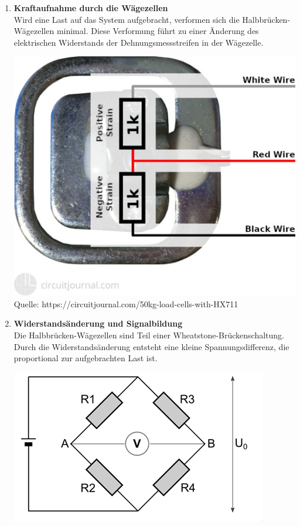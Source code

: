 \documentclass[ngerman,12pt,a4paper]{article}
\begin{document}
		\begin{enumerate}
			\item \textbf{Kraftaufnahme durch die Wägezellen} \\
			Wird eine Last auf das System aufgebracht, verformen sich die Halbbrücken-Wägezellen minimal. Diese Verformung führt zu einer Änderung des elektrischen Widerstands der Dehnungsmessstreifen in der Wägezelle.
			\begin{center}
				\begin{minipage}{0.4\textwidth}
					\centering
					\includegraphics[width=\textwidth]{Pictures/waegezelle_prinzip}
					\label{fig:waegezelle_prinzip}
					\vspace{-3pt}
					{\small Quelle: {https://circuitjournal.com/50kg-load-cells-with-HX711}}
				\end{minipage}
			\end{center}
			\newpage
			\item \textbf{Widerstandsänderung und Signalbildung} \\
			Die Halbbrücken-Wägezellen sind Teil einer Wheatstone-Brückenschaltung. Durch die Widerstandsänderung entsteht eine kleine Spannungsdifferenz, die proportional zur aufgebrachten Last ist. 
			\begin{center}
				\begin{minipage}{0.9\textwidth}
					\centering
					\includegraphics[width=\textwidth]{Pictures/wheatstone}

\end{minipage}
\end{center}
\end{enumerate}
\end{document}
